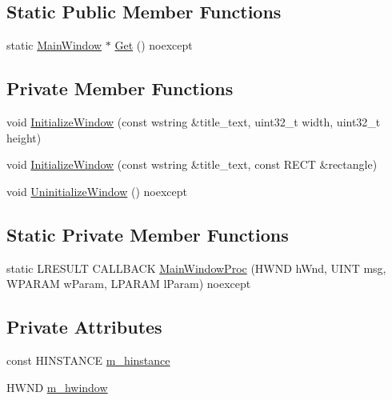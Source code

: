 \subsection*{Static Public Member Functions}
\begin{DoxyCompactItemize}
\item 
static \hyperlink{classmage_1_1_main_window}{Main\+Window} $\ast$ \hyperlink{classmage_1_1_main_window_ab670605775c88e0121afa7a52ac88ddf}{Get} () noexcept
\end{DoxyCompactItemize}
\subsection*{Private Member Functions}
\begin{DoxyCompactItemize}
\item 
void \hyperlink{classmage_1_1_main_window_a32cc789cd2e2298620c8c5b9ccab524a}{Initialize\+Window} (const wstring \&title\+\_\+text, uint32\+\_\+t width, uint32\+\_\+t height)
\item 
void \hyperlink{classmage_1_1_main_window_ab87716ce916ba180068a65294fa037e8}{Initialize\+Window} (const wstring \&title\+\_\+text, const R\+E\+CT \&rectangle)
\item 
void \hyperlink{classmage_1_1_main_window_a229ff4bcc198ed9caf2ce54966caf746}{Uninitialize\+Window} () noexcept
\end{DoxyCompactItemize}
\subsection*{Static Private Member Functions}
\begin{DoxyCompactItemize}
\item 
static L\+R\+E\+S\+U\+LT C\+A\+L\+L\+B\+A\+CK \hyperlink{classmage_1_1_main_window_a66858afa3233e7c7fbf770fa01985b78}{Main\+Window\+Proc} (H\+W\+ND h\+Wnd, U\+I\+NT msg, W\+P\+A\+R\+AM w\+Param, L\+P\+A\+R\+AM l\+Param) noexcept
\end{DoxyCompactItemize}
\subsection*{Private Attributes}
\begin{DoxyCompactItemize}
\item 
const H\+I\+N\+S\+T\+A\+N\+CE \hyperlink{classmage_1_1_main_window_a314759bf324579b568528bbf99bc5c7f}{m\+\_\+hinstance}
\item 
H\+W\+ND \hyperlink{classmage_1_1_main_window_afc9afabcf8a52d79f02c8352451863cc}{m\+\_\+hwindow}
\end{DoxyCompactItemize}


